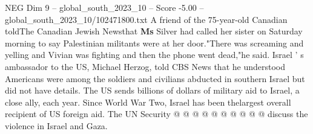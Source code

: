 \begin{textsample}{NEG Dim 9 – global\_south\_2023\_10 – Score -5.00 – global\_south\_2023\_10/102471800.txt}
A friend of the 75-year-old Canadian toldThe Canadian Jewish Newsthat \textbf{Ms} Silver had called her sister on Saturday morning to say Palestinian militants were at her door."There was screaming and yelling and Vivian was fighting and then the phone went dead,"he said.
Israel ' s ambassador to the US, Michael Herzog, told CBS News that he understood Americans were among the soldiers and civilians abducted in southern Israel but did not have details.
The US sends billions of dollars of military aid to Israel, a close ally, each year.
Since World War Two, Israel has been thelargest overall recipient of US foreign aid.
The UN Security @ @ @ @ @ @ @ @ @ @ discuss the violence in Israel and Gaza.

\end{textsample}
